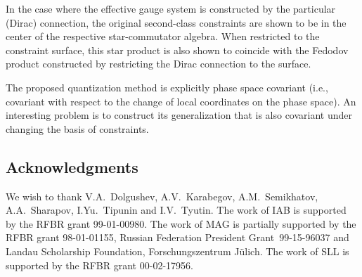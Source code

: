 \documentclass[a4paper,11pt]{amsart}
\numberwithin{thm}{section} %
\numberwithin{equation}{section} %
\numberwithin{figure}{section} %
\renewcommand{\:}{{\rm\, :\,}}
\begin{document}
In the case where the effective gauge system is constructed by the
particular (Dirac) connection, the original second-class constraints
are shown to be in the center of the respective star-commutator
algebra.  When restricted to the constraint surface, this star product
is also shown to coincide with the Fedodov product constructed by
restricting the Dirac connection to the surface.

The proposed quantization method is explicitly phase space covariant
(i.e., covariant with respect to the change of local coordinates on
the phase space).  An interesting problem is to construct its
generalization that is also covariant under changing the basis of
constraints.



\subsection*{Acknowledgments}
We wish to thank V.A.~Dolgushev, A.V.~Karabegov, A.M.~Semikhatov,
A.A.~Sha\-ra\-pov, I.Yu.~Tipunin and I.V.~Tyutin.  The work of IAB is
supported by the RFBR grant 99-01-00980. The work of MAG is partially
supported by the RFBR grant 98-01-01155, Russian Federation President
Grant~99-15-96037 and Landau Scholarship Foundation, Forschungszentrum
J\"ulich.  The work of SLL is supported by the RFBR grant 00-02-17956.
\end{document}
